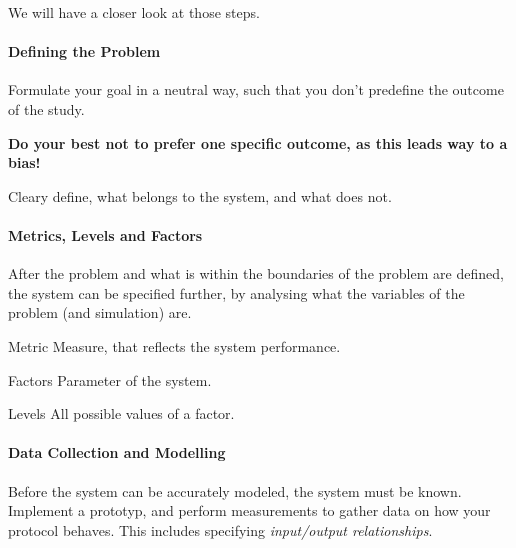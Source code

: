 \documentclass[english]{panikzettel}
\newcommand{\alert}[1]{\textbf{\textcolor{red!75!black}{#1}}}
\begin{document}
	We will have a closer look at those steps.

	\paragraph{Defining the Problem}
	\label{pgf:performance-evaluation-using-des:defining-the-problem}
	
	Formulate your goal in a neutral way, such that you don't predefine the outcome of the study.

	\alert{Do your best not to prefer one specific outcome, as this leads way to a bias!}
	
	Cleary define, what belongs to the system, and what does not.

	\paragraph{Metrics, Levels and Factors}
	\label{pgf:performance-evaluation-using-des:metrics,-levels-and-factors}
	
	After the problem and what is within the boundaries of the problem are defined, the system can be specified further, by analysing what the variables of the problem (and simulation) are.

	\begin{thirdboxl}
		\begin{defi}{Metric}
			Measure, that reflects the system performance.
		\end{defi}
	\end{thirdboxl}%
	\begin{thirdboxm}
		\begin{defi}{Factors}
			Parameter of the system.
		\end{defi}
	\end{thirdboxm}%
	\begin{thirdboxr}
		\begin{defi}{Levels}
			All possible values of a factor.
		\end{defi}
	\end{thirdboxr}
		
	\paragraph{Data Collection and Modelling}
	\label{pgf:performance-evaluation-study:data-collection-and-modelling}
	
	Before the system can be accurately modeled, the system must be known.
	Implement a prototyp, and perform measurements to gather data on how your protocol behaves. 
	This includes specifying \textit{input/output relationships}.
	
\end{document}
